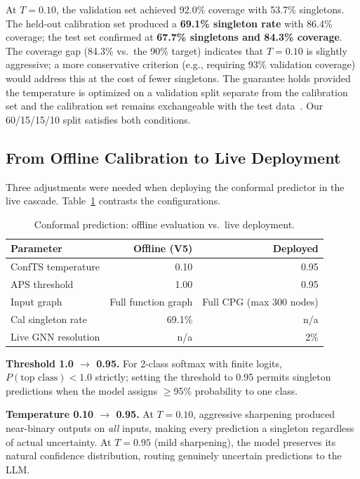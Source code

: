 At $T = 0.10$, the validation set achieved 92.0\% coverage with 53.7\% singletons. The held-out calibration set produced a \textbf{69.1\% singleton rate} with 86.4\% coverage; the test set confirmed at \textbf{67.7\% singletons and 84.3\% coverage}. The coverage gap (84.3\% vs.\ the 90\% target) indicates that $T = 0.10$ is slightly aggressive; a more conservative criterion (e.g., requiring 93\% validation coverage) would address this at the cost of fewer singletons. The guarantee holds provided the temperature is optimized on a validation split separate from the calibration set and the calibration set remains exchangeable with the test data~\cite{kofman2025}. Our 60/15/15/10 split satisfies both conditions.

\subsection{From Offline Calibration to Live Deployment}

Three adjustments were needed when deploying the conformal predictor in the live cascade. Table~\ref{tab:conformal-deployment} contrasts the configurations.

\begin{table}[H]
\centering
\small
\caption{Conformal prediction: offline evaluation vs.\ live deployment.}
\label{tab:conformal-deployment}
\begin{tabular}{@{}lrr@{}}
\toprule
\textbf{Parameter} & \textbf{Offline (V5)} & \textbf{Deployed} \\
\midrule
ConfTS temperature & 0.10 & 0.95 \\
APS threshold & 1.00 & 0.95 \\
Input graph & Full function graph & Full CPG (max 300 nodes) \\
Cal singleton rate & 69.1\% & n/a \\
Live GNN resolution & n/a & 2\% \\
\bottomrule
\end{tabular}
\end{table}

\textbf{Threshold 1.0 $\rightarrow$ 0.95.} For 2-class softmax with finite logits, $P(\text{top class}) < 1.0$ strictly; setting the threshold to 0.95 permits singleton predictions when the model assigns $\geq$95\% probability to one class.

\textbf{Temperature 0.10 $\rightarrow$ 0.95.} At $T = 0.10$, aggressive sharpening produced near-binary outputs on \emph{all} inputs, making every prediction a singleton regardless of actual uncertainty. At $T = 0.95$ (mild sharpening), the model preserves its natural confidence distribution, routing genuinely uncertain predictions to the LLM.

